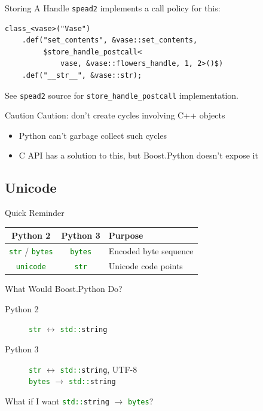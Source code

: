 \documentclass{beamer}
\def\linlinep{\lstinline[basicstyle=\ttfamily,language=python]}
\def\linlinec{\lstinline[basicstyle=\ttfamily,language=c++]}
\begin{document}
\begin{frame}[fragile=singleslide]{Storing A Handle}
  \texttt{spead2} implements a call policy for this:
  \begin{lstlisting}[language={[extra]c++}]
class_<vase>("Vase")
    .def("set_contents", &vase::set_contents,
         $store_handle_postcall<
             vase, &vase::flowers_handle, 1, 2>()$)
    .def("__str__", &vase::str);
  \end{lstlisting}
  See \texttt{spead2} source for \linlinec"store_handle_postcall" implementation.
\end{frame}

\begin{frame}{Caution}
  \alert{Caution}: don't create cycles involving C++ objects
  \begin{itemize}
    \item Python can't garbage collect such cycles
    \item C API has a solution to this, but Boost.Python doesn't expose it
  \end{itemize}
\end{frame}

\subsection{Unicode}

\begin{frame}{Quick Reminder}
  \centering
  \begin{tabular}{ccl}
    \toprule
    \textbf{Python 2} & \textbf{Python 3} & \textbf{Purpose}\\
    \midrule
    \linlinep"str" / \linlinep"bytes" & \linlinep"bytes" & Encoded byte sequence\\
    \linlinep"unicode" & \linlinep"str" & Unicode code points\\
    \bottomrule
  \end{tabular}
\end{frame}

\begin{frame}{What Would Boost.Python Do?}
  \begin{description}
    \item[Python 2] \linlinep"str" $\leftrightarrow$ \linlinec"std::string"
    \item[Python 3] \linlinep"str" $\leftrightarrow$ \linlinec"std::string", UTF-8\\
                    \linlinep"bytes" $\rightarrow$ \linlinec"std::string"
  \end{description}
  \pause
  What if I want \linlinec"std::string" $\rightarrow$ \linlinep"bytes"?
\end{frame}
\end{document}

